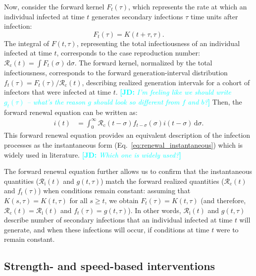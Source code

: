 \documentclass[12pt]{article}
\newcommand{\comment}{\showcomment}
\newcommand{\showcomment}[3]{\textcolor{#1}{\textbf{[#2: }\textsl{#3}\textbf{]}}}
\newcommand{\jd}[1]{\comment{cyan}{JD}{#1}}
\newcommand{\eref}[1]{Eq.~\ref{eq:#1}}
\newcommand{\Rx}[1]{\ensuremath{{\mathcal R}_{#1}}\xspace}
\newcommand{\Rc}{\Rx{\mathrm{c}}}
\newcommand{\Ri}{\Rx{\mathrm{i}}}
\newcommand{\dd}[1]{\ensuremath{\, \mathrm{d}#1}}
\newcommand{\dsigma}{\dd{\sigma}}
\begin{document}
Now, consider the forward kernel $F_t(\tau)$, which represents the rate at which an individual infected at time $t$ generates secondary infections $\tau$ time units after infection: 
\begin{equation}
F_t(\tau) = K(t+\tau, \tau).
\label{eq:fkernel}
\end{equation}
The integral of $F(t, \tau)$, representing the total infectiousness of an individual infected at time $t$, corresponds to the case reproduction number: $\Rc(t) = \int F_t(\sigma) \dsigma$. 
The forward kernel, normalized by the total infectiousness, corresponds to the forward generation-interval distribution $f_t(\tau) = F_t(\tau)/\Rc(t)$, describing realized generation intervals for a cohort of infectors that were infected at time $t$.
\jd{I'm feeling like we should write $g_t(\tau)$ -- what's the reason $g$ should look so different from $f$ and $b$?}
Then, the forward renewal equation can be written as:
\begin{align}
i(t) &= \int_0^\infty \Rc(t-\sigma) f_{t-\sigma}(\sigma) i(t-\sigma) \dsigma.
\label{eq:renewal_forward}
\end{align}
This forward renewal equation provides an equivalent description of the infection processes as the instantaneous form (\eref{renewal_instantaneous}) which is widely used in literature.
\jd{Which one is widely used?}

The forward renewal equation further allows us to confirm that the instantaneous quantities ($\Ri(t)$ and $g(t, \tau)$) match the forward realized quantities ($\Rc(t)$ and $f_t(\tau)$) when conditions remain constant:
assuming that $K(s, \tau) = K(t, \tau)$ for all $s \geq t$, we obtain $F_{t}(\tau) = K(t, \tau)$ (and therefore, $\Rc(t) = \Ri(t)$ and $f_{t}(\tau) = g(t,\tau)$).
In other words, $\Ri(t)$ and $g(t,\tau)$ describe number of secondary infections that an individual infected at time $t$ will generate, and when these infections will occur, if conditions at time $t$ were to remain constant.

\subsection{Strength- and speed-based interventions}
\end{document}

